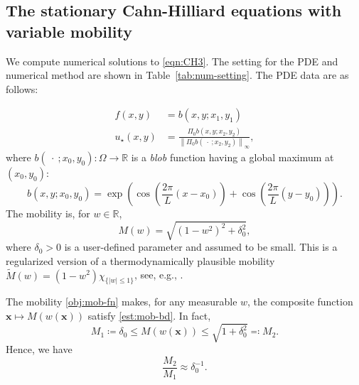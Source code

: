 \documentclass{amsart}
\newcommand{\bfx}{\boldsymbol{x}}
\newcommand{\slot}{{\ \cdot \ }}
\newcommand{\norm}[2]{\left\| #1 \right\| _{#2}}
\newcommand{\RR}{\mathbb{R}}
\theoremstyle{definition}
\begin{document}
\subsection{The stationary Cahn-Hilliard equations with variable mobility}
\label{sec:num-exp2-Mob}
We compute numerical solutions to \eqref{eqn:CH3}.
The setting for the PDE and numerical method are shown in Table~\ref{tab:num-setting}.
The PDE data are as follows:

\begin{align}%
	f(x,y)&=b(x,y;x_{1}, y_{1})
	\label{obj:f-L2data}
	\\
	u_\star(x,y)&=\frac{\Pi_0 b(x,y; x_{2}, y_{2})}{\norm{\Pi_0 b(\slot; x_{2}, y_{2})}{\infty}},
	\label{obj:u-star}
\end{align}
where $b(\slot; x_0, y_0):\Omega \to \RR$ is a \emph{blob} function having a global maximum at $(x_0,y_0)$:
\begin{equation}\label{obj:blob}
	b(x,y;x_0, y_0) = \exp\left( \cos\left( \frac{2\pi}{L}(x-x_0) \right)+\cos\left(\frac{2\pi}{L}(y-y_0)\right) \right).
\end{equation}
The mobility is, for $w \in \RR$,
\begin{equation}\label{obj:mob-fn}
	M(w)= \sqrt{(1-w^2)^2 + \delta_0^2},
\end{equation}
where $\delta_0>0$ is a user-defined parameter and assumed to be small. 
This is a regularized version of a thermodynamically plausible mobility $\tilde M (w)= (1-w^2) \chi_{\{|w|\leq 1\}}$, see, e.g., \cite{elliott1996degenerate}.
 
The mobility \eqref{obj:mob-fn} makes, for any measurable $w$, the composite function $\bfx \mapsto M(w(\bfx))$ satisfy \eqref{est:mob-bd}. In fact,
\begin{equation*}
	M_1 \coloneqq \delta_0 \le M(w(\bfx)) \le \sqrt{1+\delta_0^2} \eqqcolon M_2.
\end{equation*}
Hence, we have
\begin{equation}
	\frac{M_2}{M_1} \approx \delta_0^{-1}.
	\label{est:mob-ratio}
\end{equation}
\end{document}
